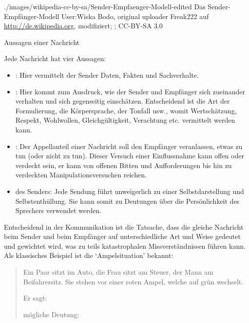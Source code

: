 {}
{}
{}
{./images/wikipedia-cc-by-sa/Sender-Empfaenger-Modell-edited}
{Das Sender-Empfänger-Modell \cite{Informatik3}}
{User:Wiska Bodo, original uploader Freak222
auf \url{http://de.wikipedia.org}, modifiziert; ; CC-BY-SA
3.0}



{Aussagen einer Nachricht}
{Jede Nachricht hat vier Aussagen:

\begin{itemize}
  \item {}: Hier vermittelt der
  Sender Daten, Fakten und Sachverhalte.
  \item {}: Hier
  kommt zum Ausdruck, wie der Sender und Empfänger sich
  zueinander verhalten und sich gegenseitig einschätzen.
  Entscheidend ist die Art der Formulierung, die
  Körpersprache, der Tonfall usw., womit Wertschätzung, Respekt,
  Wohlwollen, Gleichgültigkeit, Verachtung etc. vermittelt
  werden kann.
  \item {}: Der Appellanteil einer Nachricht
  soll den Empfänger veranlassen, etwas zu tun
  (oder nicht zu tun). 
  Dieser Versuch einer Einflussnahme kann offen oder
  verdeckt sein, er kann von offenen Bitten und
  Aufforderungen bis hin zu verdeckten
  Manipulationsversuchen reichen.
  \item {} des Senders: Jede Sendung
  führt unweigerlich zu einer Selbstdarstellung und Selbstenthüllung.
  Sie kann somit zu Deutungen über die
  Persönlichkeit des Sprechers verwendet werden. 
\end{itemize}

Entscheidend in der Kommunikation ist die Tatsache, dass die
gleiche Nachricht beim Sender und beim Empfänger auf
unterschiedliche Art und Weise gedeutet und gewichtet wird,
was zu teils katastrophalen Missverständnissen führen kann. Als
klassisches Beispiel ist die \enquote*{Ampelsituation}
bekannt: 

\begin{quote}
  Ein Paar sitzt im Auto, die Frau sitzt am Steuer, der Mann
  am Beifahrersitz. Sie stehen vor einer roten Ampel, welche
  auf grün wechselt.
  
  Er sagt: 
  
   mögliche Deutung:\small
  

\end{quote}}
